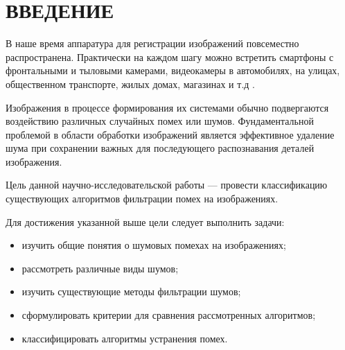 \chapter*{ВВЕДЕНИЕ}

В наше время аппаратура для регистрации изображений повсеместно распространена. Практически на каждом шагу можно встретить смартфоны с фронтальными и тыловыми камерами, видеокамеры в автомобилях, на улицах, общественном транспорте, жилых домах, магазинах и т.д \cite{cameras}.

Изображения в процессе формирования их системами обычно подвергаются воздействию различных случайных помех или шумов. Фундаментальной проблемой в области обработки изображений является эффективное удаление шума при сохранении важных для последующего распознавания деталей изображения.

Цель данной научно-исследовательской работы --- провести классификацию существующих алгоритмов фильтрации помех на изображениях.

Для достижения указанной выше цели следует выполнить задачи:
\begin{itemize}
	\item изучить общие понятия о шумовых помехах на изображениях;
	\item рассмотреть различные виды шумов;
	\item изучить существующие методы фильтрации шумов;
	\item сформулировать критерии для сравнения рассмотренных алгоритмов;
	\item классифицировать алгоритмы устранения помех.
\end{itemize}